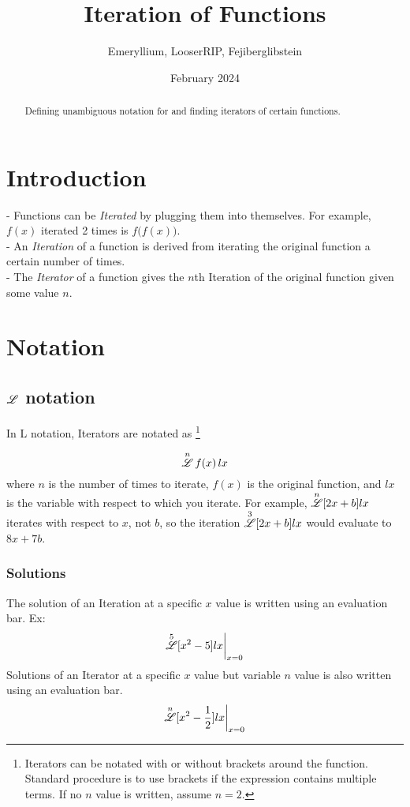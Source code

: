 \documentclass[12pt, letterpaper]{article}
\title{Iteration of Functions}
\author{Emeryllium, LooserRIP, Fejiberglibstein}
\date{February 2024}
\begin{document}
\maketitle

\begin{abstract}
    Defining unambiguous notation for and finding iterators of certain functions.
\end{abstract}

\tableofcontents
\newpage

\section{Introduction}
- Functions can be \textit{Iterated} by plugging them into themselves. For example, $f(x)$ iterated 2 times is $f\big(f(x)\big)$. 
\\
- An \textit{Iteration} of a function is derived from iterating the original function a certain number of times.
\\
- The \textit{Iterator} of a function gives the $n$th Iteration of the original function given some value $n$.


\section{Notation}

\subsection{$\overset{}{\mathscr{L}}$ notation}
In L notation, Iterators are notated as
    \footnote{Iterators can be notated with or without brackets around the function. Standard procedure is to use brackets if the expression contains multiple terms. If no $n$ value is written, assume $n=2$.}

$$ \overset{n}{\mathscr{L}} \, f(x) \, lx$$
where $n$ is the number of times to iterate, $f(x)$ is the original function, and $lx$ is the variable with respect to which you iterate. For example, $\overset{n}{\mathscr{L}} [2x+b] lx$
iterates with respect to $x$, not $b$, so the iteration $\overset{3}{\mathscr{L}} [2x+b] lx$ would evaluate to $8x+7b$.

\subsubsection{Solutions}
The solution of an Iteration at a specific $x$ value is written using an evaluation bar. Ex:
$$\overset{5}{\mathscr{L}}[x^2-5]lx\bigg|_{x=0}$$
Solutions of an Iterator at a specific $x$ value but variable $n$ value is also written using an evaluation bar.
$$\overset{n}{\mathscr{L}}[x^2-\frac{1}{2}]lx\bigg|_{x=0}$$
\end{document}
